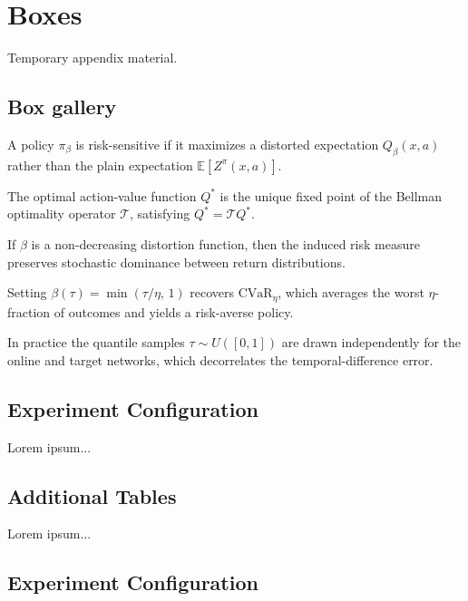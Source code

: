 \chapter{Boxes}
Temporary appendix material.

\section{Box gallery}
\begin{definition}
A policy $\pi_\beta$ is risk-sensitive if it maximizes a distorted expectation
$Q_\beta(x,a)$ rather than the plain expectation $\mathbb{E}[Z^\pi(x,a)]$.
\end{definition}

\begin{theorem}
The optimal action-value function $Q^*$ is the unique fixed point of the Bellman
optimality operator $\mathcal{T}$, satisfying $Q^* = \mathcal{T}Q^*$.
\end{theorem}

\begin{proposition}
If $\beta$ is a non-decreasing distortion function, then the induced risk measure
preserves stochastic dominance between return distributions.
\end{proposition}

\begin{example}
Setting $\beta(\tau) = \min(\tau/\eta,\, 1)$ recovers $\mathrm{CVaR}_\eta$, which
averages the worst $\eta$-fraction of outcomes and yields a risk-averse policy.
\end{example}

\begin{remark}
In practice the quantile samples $\tau \sim U([0,1])$ are drawn independently for
the online and target networks, which decorrelates the temporal-difference error.
\end{remark}

\section{Experiment Configuration}
Lorem ipsum...

\section{Additional Tables}
Lorem ipsum...

\section{Experiment Configuration}


